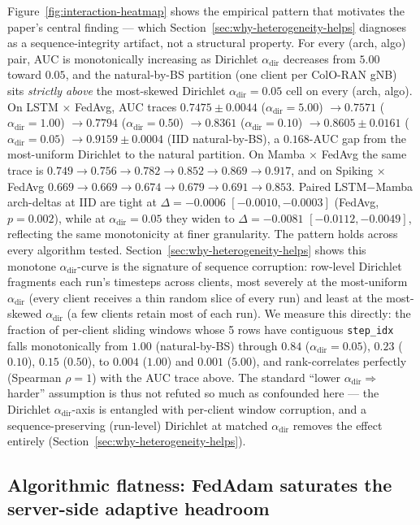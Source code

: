 \documentclass[journal]{IEEEtran}
\newcommand{\alphadir}{\ensuremath{\alpha_{\mathrm{dir}}}}
\begin{document}
Figure~\ref{fig:interaction-heatmap} shows the empirical pattern that motivates the paper's central finding --- which Section~\ref{sec:why-heterogeneity-helps} diagnoses as a sequence-integrity artifact, not a structural property. For every (arch, algo) pair, AUC is monotonically increasing as Dirichlet $\alphadir$ decreases from $5.00$ toward $0.05$, and the natural-by-BS partition (one client per ColO-RAN gNB) sits \emph{strictly above} the most-skewed Dirichlet $\alphadir = 0.05$ cell on every (arch, algo). On LSTM $\times$ FedAvg, AUC traces $0.7475 \pm 0.0044$ ($\alphadir = 5.00$) $\rightarrow 0.7571$ ($\alphadir = 1.00$) $\rightarrow 0.7794$ ($\alphadir = 0.50$) $\rightarrow 0.8361$ ($\alphadir = 0.10$) $\rightarrow 0.8605 \pm 0.0161$ ($\alphadir = 0.05$) $\rightarrow 0.9159 \pm 0.0004$ (IID natural-by-BS), a $0.168$-AUC gap from the most-uniform Dirichlet to the natural partition. On Mamba $\times$ FedAvg the same trace is $0.749 \rightarrow 0.756 \rightarrow 0.782 \rightarrow 0.852 \rightarrow 0.869 \rightarrow 0.917$, and on Spiking $\times$ FedAvg $0.669 \rightarrow 0.669 \rightarrow 0.674 \rightarrow 0.679 \rightarrow 0.691 \rightarrow 0.853$. Paired LSTM$-$Mamba arch-deltas at IID are tight at $\Delta = -0.0006$ $[-0.0010, -0.0003]$ (FedAvg, $p = 0.002$), while at $\alphadir = 0.05$ they widen to $\Delta = -0.0081$ $[-0.0112, -0.0049]$, reflecting the same monotonicity at finer granularity. The pattern holds across every algorithm tested. Section~\ref{sec:why-heterogeneity-helps} shows this monotone $\alphadir$-curve is the signature of sequence corruption: row-level Dirichlet fragments each run's timesteps across clients, most severely at the most-uniform $\alphadir$ (every client receives a thin random slice of every run) and least at the most-skewed $\alphadir$ (a few clients retain most of each run). We measure this directly: the fraction of per-client sliding windows whose 5 rows have contiguous \lstinline|step_idx| falls monotonically from $1.00$ (natural-by-BS) through $0.84$ ($\alphadir{=}0.05$), $0.23$ ($0.10$), $0.15$ ($0.50$), to $0.004$ ($1.00$) and $0.001$ ($5.00$), and rank-correlates perfectly (Spearman $\rho{=}1$) with the AUC trace above. The standard ``lower $\alphadir \Rightarrow$ harder'' assumption is thus not refuted so much as confounded here --- the Dirichlet $\alphadir$-axis is entangled with per-client window corruption, and a sequence-preserving (run-level) Dirichlet at matched $\alphadir$ removes the effect entirely (Section~\ref{sec:why-heterogeneity-helps}).

\subsection{Algorithmic flatness: FedAdam saturates the server-side adaptive headroom}\label{sec:fedadam-ceiling}
\end{document}
